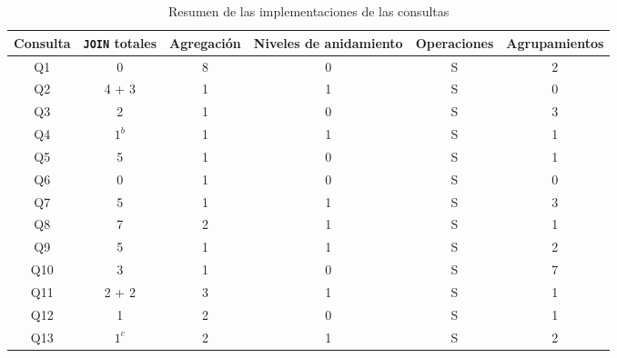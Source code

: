 \documentclass[12pt, letter paper]{report}
\begin{document}
        \begin{table}[H]
          \centering
          \begin{threeparttable}
          \caption{Resumen de las implementaciones de las consultas}
          \begin{tabular}{| c | c | c | c | c | c |}
            \hline
            Consulta        & \texttt{JOIN} totales & Agregación & Niveles de anidamiento & Operaciones & Agrupamientos \\ \hline
                Q1          &           0           &      8     &            0           &       S     &       2       \\ \hline
                Q2          &         4 + 3         &      1     &            1           &       S     &       0       \\ \hline
                Q3          &           2           &      1     &            0           &       S     &       3       \\ \hline
                Q4          &         $1^b$         &      1     &            1           &       S     &       1       \\ \hline
                Q5          &           5           &      1     &            0           &       S     &       1       \\ \hline
                Q6          &           0           &      1     &            0           &       S     &       0       \\ \hline
                Q7          &           5           &      1     &            1           &       S     &       3       \\ \hline
                Q8          &           7           &      2     &            1           &       S     &       1       \\ \hline
                Q9          &           5           &      1     &            1           &       S     &       2       \\ \hline
               Q10          &           3           &      1     &            0           &       S     &       7       \\ \hline
               Q11          &         2 + 2         &      3     &            1           &       S     &       1       \\ \hline
               Q12          &           1           &      2     &            0           &       S     &       1       \\ \hline
               Q13\tnote{a} &         $1^c$         &      2     &            1           &       S     &       2       \\ \hline

\end{tabular}
\end{threeparttable}
\end{table}
\end{document}
